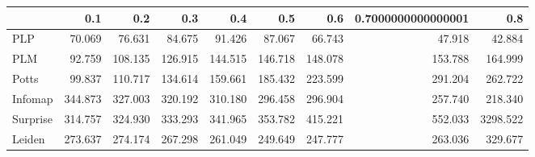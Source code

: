 \begin{tabular}{lrrrrrrrr}
\toprule
{} &     0.1 &     0.2 &     0.3 &     0.4 &     0.5 &     0.6 & 0.7000000000000001 &      0.8 \\
\midrule
PLP      &  70.069 &  76.631 &  84.675 &  91.426 &  87.067 &  66.743 &             47.918 &   42.884 \\
PLM      &  92.759 & 108.135 & 126.915 & 144.515 & 146.718 & 148.078 &            153.788 &  164.999 \\
Potts    &  99.837 & 110.717 & 134.614 & 159.661 & 185.432 & 223.599 &            291.204 &  262.722 \\
Infomap  & 344.873 & 327.003 & 320.192 & 310.180 & 296.458 & 296.904 &            257.740 &  218.340 \\
Surprise & 314.757 & 324.930 & 333.293 & 341.965 & 353.782 & 415.221 &            552.033 & 3298.522 \\
Leiden   & 273.637 & 274.174 & 267.298 & 261.049 & 249.649 & 247.777 &            263.036 &  329.677 \\
\bottomrule
\end{tabular}
